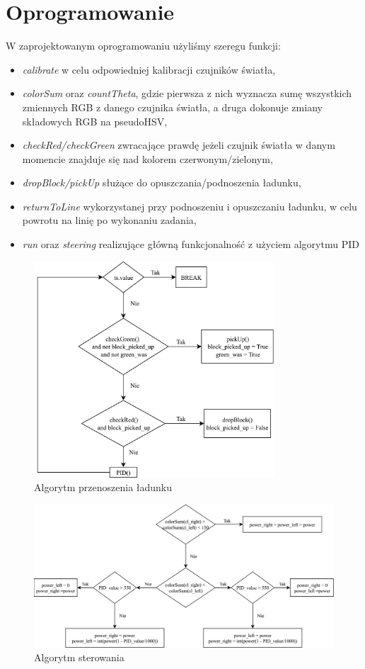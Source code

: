 \section{Oprogramowanie}

W zaprojektowanym oprogramowaniu użyliśmy szeregu funkcji:
\begin{itemize}
\item
\textit{calibrate} w celu odpowiedniej kalibracji czujników światła,
\item
\textit{colorSum} oraz \textit{countTheta}, gdzie pierwsza z nich wyznacza sumę wszystkich zmiennych RGB z danego czujnika światła, a druga dokonuje zmiany składowych RGB na pseudoHSV,
 \item
 \textit{checkRed/checkGreen} zwracające prawdę jeżeli czujnik światła w danym momencie znajduje się nad kolorem czerwonym/zielonym, 
 \item
 \textit{dropBlock/pickUp} służące do opuszczania/podnoszenia ładunku,
 \item
\textit{returnToLine} wykorzystanej przy podnoszeniu i opuszczaniu ładunku, w celu powrotu na linię po wykonaniu zadania,
 \item
 \textit{run} oraz \textit{steering} realizujące główną funkcjonalność z użyciem algorytmu PID
\end{itemize}

\begin{figure}[H]
    \centering
    \includegraphics[width=0.8\textwidth]{Images/Cargo}
    \caption[]{Algorytm przenoszenia ładunku}
\end{figure}

\begin{figure}[H]
    \centering
    \includegraphics[width=1.2\textwidth]{Images/Sterring}
    \caption[]{Algorytm sterowania}
\end{figure}